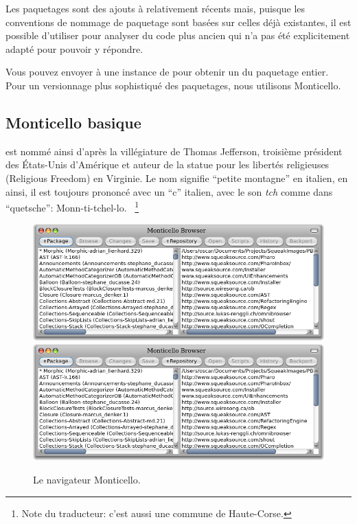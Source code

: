 \documentclass[a4paper,10pt,twoside]{book}
\begin{document}
Les paquetages sont des ajouts \`a \pharo relativement r\'ecents
mais, puisque les conventions de nommage de paquetage sont bas\'ees
sur celles d\'ej\`a existantes, il est possible d'utiliser
 pour analyser du code plus ancien qui n'a pas 
\'et\'e explicitement adapt\'e pour pouvoir y r\'epondre.


Vous pouvez envoyer  \`a une instance de  
pour obtenir un \changeset du paquetage entier.
Pour un versionnage plus sophistiqu\'e des paquetages, nous utilisons 
Monticello.

\subsection{Monticello basique}

 est nomm\'e ainsi d'apr\`es la vill\'egiature 
de Thomas Jefferson, troisi\`eme pr\'esident des \'Etats-Unis d'Am\'erique
et auteur de la statue pour les libert\'es religieuses (Religious Freedom) en
Virginie. Le nom signifie ``petite montagne'' en italien, en ainsi, il est
toujours prononc\'e avec un ``c'' italien, \ie avec le son \emph{tch} comme
dans ``quetsche'':
Monn-ti-tchel-lo.
~\footnote{Note du traducteur: c'est aussi une commune de Haute-Corse.}

\begin{figure}[btp]
	\begin{center}
	\ifluluelse
		{\includegraphics[width=\textwidth]{freshMonticello}}
		{\includegraphics[scale=0.7]{freshMonticello}}
	\end{center}
	\caption{Le navigateur Monticello.}
	\label{fig:freshMonticello}
\end{figure}
\end{document}
